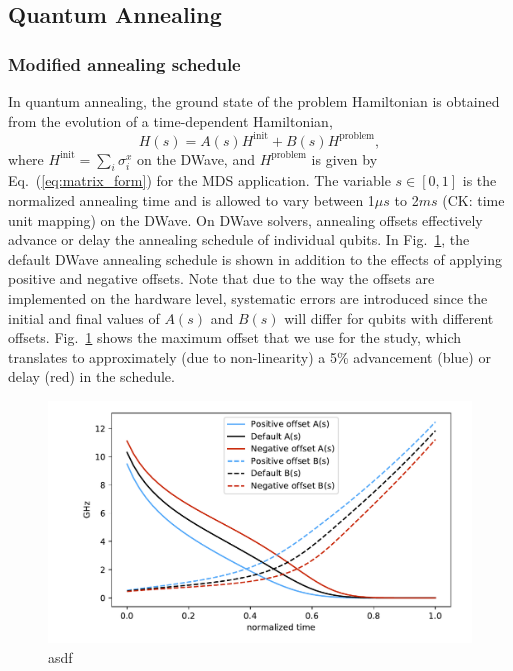\documentclass[prd,twocolumn,tightenlines,preprintnumbers,showpacs,superscriptaddress,notitlepage,nofootinbib,eqsecnum,floatfix,longbibliography]{revtex4}
\begin{document}
\subsection{Quantum Annealing}
\label{methods:annealing}

\subsubsection{Modified annealing schedule}
\label{methods:annealing-schedule}

In quantum annealing, the ground state of the problem Hamiltonian is obtained from the evolution of a time-dependent Hamiltonian,
\begin{equation}
    H(s) = A(s) H^{\textrm{init}} + B(s) H^{\textrm{problem}}, \label{eq:tdhamiltonian}
\end{equation}
where $H^\textrm{init}=\sum_i\sigma^x_i$ on the DWave, and $H^\textrm{problem}$ is given by Eq.~(\ref{eq:matrix_form}) for the MDS application.
The variable $s\in [0, 1]$ is the normalized annealing time and is allowed to vary between 1$\mu s$ to 2$ms$ (CK: time unit mapping) on the DWave.
On DWave solvers, annealing offsets effectively advance or delay the annealing schedule of individual qubits.
In Fig.~\ref{fig:anneal_schedule}, the default DWave annealing schedule is shown in addition to the effects of applying positive and negative offsets.
Note that due to the way the offsets are implemented on the hardware level, systematic errors are introduced since the initial and final values of $A(s)$ and $B(s)$ will differ for qubits with different offsets.
Fig.~\ref{fig:anneal_schedule} shows the maximum offset that we use for the study, which translates to approximately (due to non-linearity) a 5\% advancement (blue) or delay (red) in the schedule.

\begin{figure}[b]
    \centering
    \includegraphics[width=\columnwidth]{./figures/anneal_schedule.pdf}
    \caption{asdf}
    \label{fig:anneal_schedule}
\end{figure}
\end{document}

